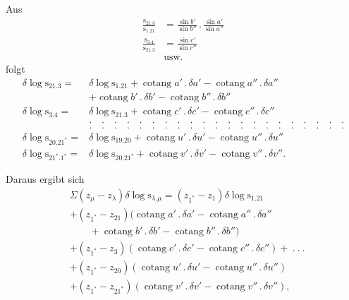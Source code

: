 \par\noindent\hspace*{\parindent}Aus
\[
\begin{aligned}
\frac{\mathrm{s}_{21.3}}{\mathrm{s}_{1.21}}&=\frac{\sin b'}{\sin b''}\,.\,\frac{\sin a'}{\sin a''}\\[7pt]
\frac{\mathrm{s}_{3.4}}{\mathrm{s}_{21.3}}&=\frac{\sin c'}{\sin c''}\\[5pt]
&\text{usw.}
\end{aligned}
\]
\noindent folgt
\[
\begin{aligned}
\delta\log\mathrm{s}_{21.3}={}&\delta\log\mathrm{s}_{1.21}+\operatorname{cotang}a'\,.\,\delta a'-\operatorname{cotang}a''\,.\,\delta a''\\
&+\operatorname{cotang}b'\,.\,\delta b'-\operatorname{cotang}b''\,.\,\delta b''\\
\delta\log\mathrm{s}_{3.4}={}&\delta\log\mathrm{s}_{21.3}+\operatorname{cotang}c'\,.\,\delta c'-\operatorname{cotang}c''\,.\,\delta c''\\
&.\quad.\quad.\quad.\quad.\quad.\quad.\quad.\quad.\quad.\quad.\quad.\quad.\quad.\quad.\quad.\quad.\quad.\quad.\quad.\quad.\\
&.\quad.\quad.\quad.\quad.\quad.\quad.\quad.\quad.\quad.\quad.\quad.\quad.\quad.\quad.\quad.\quad.\quad.\quad.\quad.\quad.\\
\delta\log\mathrm{s}_{20.21^*}={}&\delta\log\mathrm{s}_{19.20}+\operatorname{cotang}u'\,.\,\delta u'-\operatorname{cotang}u''\,.\,\delta u''\\
\delta\log\mathrm{s}_{21^*.1^*}={}&\delta\log\mathrm{s}_{20.21^*}+\operatorname{cotang}v'\,.\,\delta v'-\operatorname{cotang}v''\,.\,\delta v''.
\end{aligned}
\]
\par\noindent\hspace*{\parindent}Daraus ergibt sich
\[
\begin{aligned}
&\Sigma(z_\mu-z_\lambda)\delta\log\mathrm{s}_{\lambda.\mu}=(z_{1^*}-z_1)\delta\log\mathrm{s}_{1.21}\\
&+(z_{1^*}-z_{21})\bigl(\operatorname{cotang}a'\,.\,\delta a'-\operatorname{cotang}a''\,.\,\delta a''\\
&\qquad+\operatorname{cotang}b'\,.\,\delta b'-\operatorname{cotang}b''\,.\,\delta b''\bigr)\\
&+(z_{1^*}-z_3)(\operatorname{cotang}c'\,.\,\delta c'-\operatorname{cotang}c''\,.\,\delta c'')+\ .\ .\ .\\
&+(z_{1^*}-z_{20})(\operatorname{cotang}u'\,.\,\delta u'-\operatorname{cotang}u''\,.\,\delta u'')\\
&+(z_{1^*}-z_{21^*})(\operatorname{cotang}v'\,.\,\delta v'-\operatorname{cotang}v''\,.\,\delta v''),
\end{aligned}
\]
